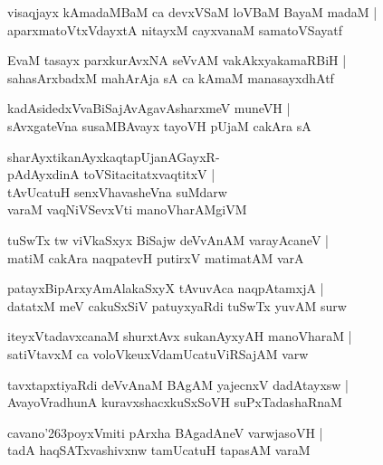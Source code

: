 \documentclass[twoside,12pt,openright]{book}
\def\S{\char'263}
\newcounter{shloka}[chapter]
\begin{document}
\begin{shloka}%
visaqjayx kAmadaMBaM ca devxVSaM loVBaM BayaM madaM |\\
aparxmatoVtxVdayxtA nitayxM cayxvanaM samatoVSayatf
\end{shloka}

\begin{shloka}%
EvaM tasayx parxkurAvxNA seVvAM vakAkxyakamaRBiH |\\
sahasArxbadxM mahArAja sA ca kAmaM manasayxdhAtf
\end{shloka}

\begin{shloka}%
kadAsidedxVvaBiSajAvAgavAsharxmeV muneVH |\\
sAvxgateVna susaMBAvayx tayoVH pUjaM cakAra sA 
\end{shloka}

\begin{shloka}%
sharAyxtikanAyxkaqtapUjanAGayxR-\\
pAdAyxdinA toVSitacitatxvaqtitxV |\\
tAvUcatuH senxVhavasheVna suMdarw \\
varaM vaqNiVSevxVti manoVharAMgiVM 
\end{shloka}

\begin{shloka}%
tuSwTx tw viVkaSxyx BiSajw deVvAnAM varayAcaneV |\\
matiM cakAra naqpatevH putirxV matimatAM varA 
\end{shloka}

\begin{shloka}%
patayxBipArxyAmAlakaSxyX tAvuvAca naqpAtamxjA |\\
datatxM meV cakuSxSiV patuyxyaRdi tuSwTx yuvAM surw
\end{shloka}

\begin{shloka}%
iteyxVtadavxcanaM shurxtAvx sukanAyxyAH manoVharaM |\\
satiVtavxM ca voloVkeuxVdamUcatuViRSajAM varw 
\end{shloka}

\begin{shloka}%
tavxtapxtiyaRdi deVvAnaM BAgAM yajecnxV dadAtayxsw |\\
AvayoVradhunA kuravxshacxkuSxSoVH suPxTadashaRnaM
\end{shloka}

\begin{shloka}%
cavano\S poyxVmiti pArxha BAgadAneV varwjasoVH |\\
tadA haqSATxvashivxnw tamUcatuH tapasAM varaM  
\end{shloka}
\end{document}
